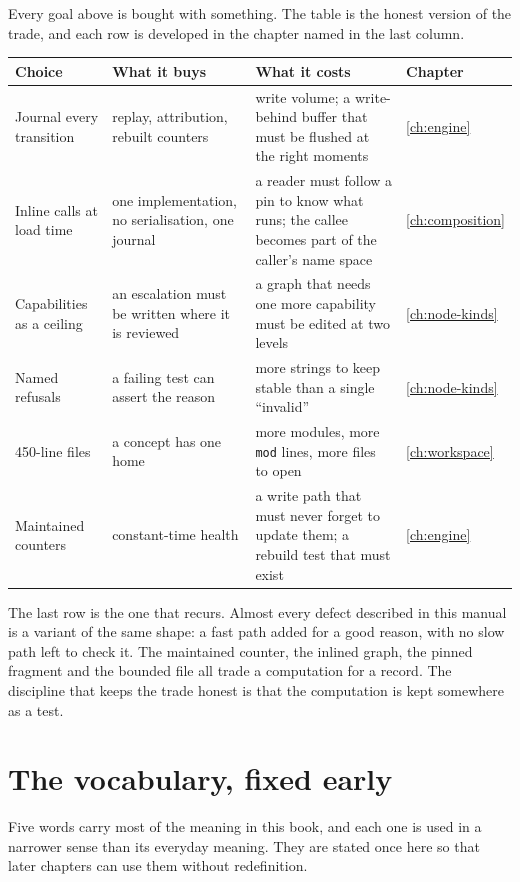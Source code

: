 Every goal above is bought with something. The table is the honest version of the trade, and each
row is developed in the chapter named in the last column.

\begin{longtable}{@{}p{}p{}p{}p{}@{}}
	\toprule
	\textbf{Choice} & \textbf{What it buys} & \textbf{What it costs} & \textbf{Chapter} \\
	\midrule
	\endhead
	Journal every transition & replay, attribution, rebuilt counters & write volume; a write-behind
	buffer that must be flushed at the right moments & \ref{ch:engine} \\
	Inline calls at load time & one implementation, no serialisation, one journal & a reader must
	follow a pin to know what runs; the callee becomes part of the caller's name space &
	\ref{ch:composition} \\
	Capabilities as a ceiling & an escalation must be written where it is reviewed & a graph that
	needs one more capability must be edited at two levels & \ref{ch:node-kinds} \\
	Named refusals & a failing test can assert the reason & more strings to keep stable than a
	single \enquote{invalid} & \ref{ch:node-kinds} \\
	450-line files & a concept has one home & more modules, more \texttt{mod} lines, more files to
	open & \ref{ch:workspace} \\
	Maintained counters & constant-time health & a write path that must never forget to update
	them; a rebuild test that must exist & \ref{ch:engine} \\
	\bottomrule
\end{longtable}

The last row is the one that recurs. Almost every defect described in this manual is a variant of
the same shape: a fast path added for a good reason, with no slow path left to check it. The
maintained counter, the inlined graph, the pinned fragment and the bounded file all trade a
computation for a record. The discipline that keeps the trade honest is that the computation is
kept somewhere as a test.

\section{The vocabulary, fixed early}

Five words carry most of the meaning in this book, and each one is used in a narrower sense than
its everyday meaning. They are stated once here so that later chapters can use them without
redefinition.

